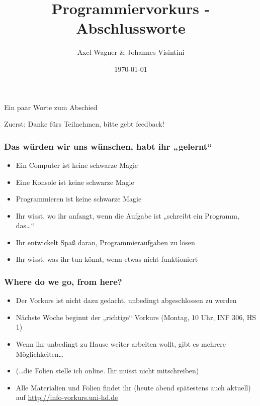 \documentclass{beamer}
\begin{document}
\title{Programmiervorkurs - Abschlussworte}
\author{Axel Wagner \& Johannes Visintini}
\date{\today}

\begin{frame}
\titlepage
\end{frame}

\begin{frame}
    \begin{center}
        \Huge Ein paar Worte zum Abschied
    \end{center}
    \pause\begin{center}
        \Huge Zuerst: Danke fürs Teilnehmen, bitte gebt feedback!
    \end{center}
\end{frame}

\begin{frame}
    \frametitle{Das würden wir uns wünschen, habt ihr „gelernt“}
    \begin{itemize}
        \pause\item Ein Computer ist keine schwarze Magie
        \pause\item Eine Konsole ist keine schwarze Magie
        \pause\item Programmieren ist keine schwarze Magie
        \pause\item Ihr wisst, wo ihr anfangt, wenn die Aufgabe ist „schreibt
            ein Programm, das\dots“
        \pause\item Ihr entwickelt Spaß daran, Programmieraufgaben zu lösen
        \pause\item Ihr wisst, was ihr tun könnt, wenn etwas nicht funktioniert
    \end{itemize}
\end{frame}

\begin{frame}
    \frametitle{Where do we go, from here?}

    \begin{itemize}
        \pause\item Der Vorkurs ist nicht dazu gedacht, unbedingt abgeschlossen
            zu werden
        \pause\item Nächste Woche beginnt der „richtige“ Vorkurs (Montag, 10
            Uhr, INF 306, HS 1)
        \pause\item Wenn ihr unbedingt zu Hause weiter arbeiten wollt, gibt es
            mehrere Möglichkeiten\dots
        \pause\item (\dots die Folien stelle ich online. Ihr müsst nicht
            mitschreiben)
        \pause\item Alle Materialien und Folien findet ihr (heute abend
            spätestens auch aktuell) auf \url{http://info-vorkurs.uni-hd.de}
    \end{itemize}
\end{frame}
\end{document}

